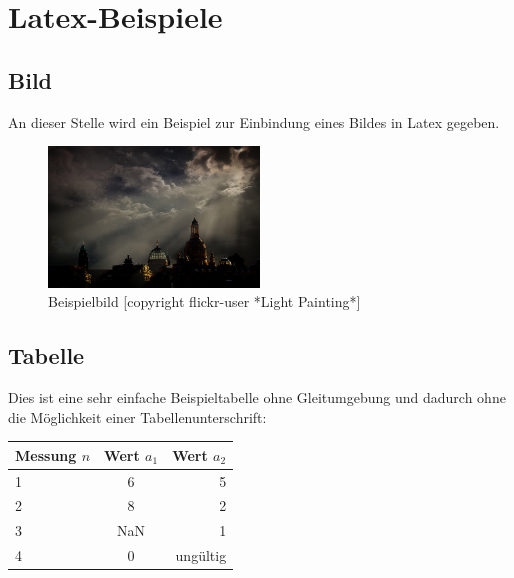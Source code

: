 \chapter{Latex-Beispiele}
\label{chap:Beispiele}

\section{Bild}
\label{sec:Bild}
An dieser Stelle wird ein Beispiel zur Einbindung eines Bildes in Latex gegeben. 
\begin{figure}[htbp] %
\begin{center}
\includegraphics[width=0.5\textwidth]{img/Bild} %
\end{center}
\caption[Beispielbild]{Beispielbild [copyright flickr-user *Light Painting*] }
\label{fig:multpraef}
\end{figure}


\section{Tabelle}
\label{sec:Tabelle}

Dies ist eine sehr einfache Beispieltabelle ohne Gleitumgebung und dadurch ohne die Möglichkeit einer Tabellenunterschrift:
\begin{center}
	\begin{tabular}{lcr}
	\toprule
	Messung $n$ & Wert $a_1$ & Wert $a_2$\\
	\midrule
	1 & 6 & 5\\
	\midrule
	2 & 8 & 2\\
	\midrule
	3 & NaN & 1\\
	\midrule
	4 & 0 & ungültig \\
	\bottomrule
	\end{tabular}
\end{center}
\clearpage %

